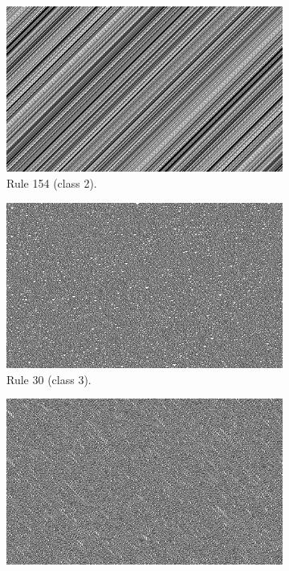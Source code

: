 \documentclass[12pt]{article}
\begin{document}
\begin{figure} [!h]
\begin{subfigure}{.5\textwidth}
  \centering
  \includegraphics[width=.9\linewidth]{rule154}
  \caption{Rule 154 (class 2).}
  \label{fig:rule154}
 \end{subfigure}%
\begin{subfigure}{.5\textwidth}
  \centering
  \includegraphics[width=.9\linewidth]{rule30}
  \caption{Rule 30 (class 3).}
  \label{fig:rule30}
\end{subfigure}
\begin{subfigure}{.5\textwidth}
  \centering
  \includegraphics[width=.9\linewidth]{rule45}

\end{subfigure}
\end{figure}
\end{document}
